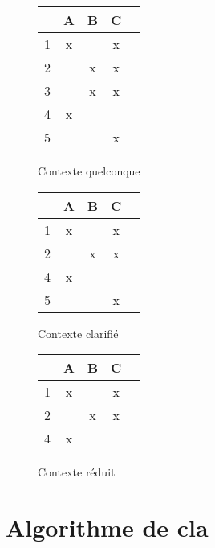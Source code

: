 \begin{figure}[H]
	\begin{minipage}[t]{0.3\textwidth}
	\begin{center}
		\begin{tabular}{ l | c c c c }
			 & A & B & C \\
			\hline
			1 & x &  & x \\
			2 &  & x & x \\
			3 &  & x & x \\
			4 & x &  &  \\
			5 &  &  & x \\
		\end{tabular}
		\caption{Contexte quelconque}
		\label{contexte_quelconque}
	\end{center}
	\end{minipage}
	\begin{minipage}[t]{0.3\textwidth}
	\begin{center}
		\begin{tabular}{ l | c c c c }
			 & A & B & C \\
			\hline
			1 & x &  & x \\
			2 &  & x & x \\
			4 & x &  &  \\
			5 &  &  & x \\
		\end{tabular}
		\caption{Contexte clarifié}
		\label{contexte_clarifié}
	\end{center}
	\end{minipage}
	\begin{minipage}[t]{0.3\textwidth}
	\begin{center}
		\begin{tabular}{ l | c c c c }
			 & A & B & C \\
			\hline
			1 & x &  & x \\
			2 &  & x & x \\
			4 & x &  &  \\
		\end{tabular}
		\caption{Contexte réduit}
		\label{contexte_réduit}
	\end{center}
	\end{minipage}
\end{figure}

\section{Algorithme de cla}

